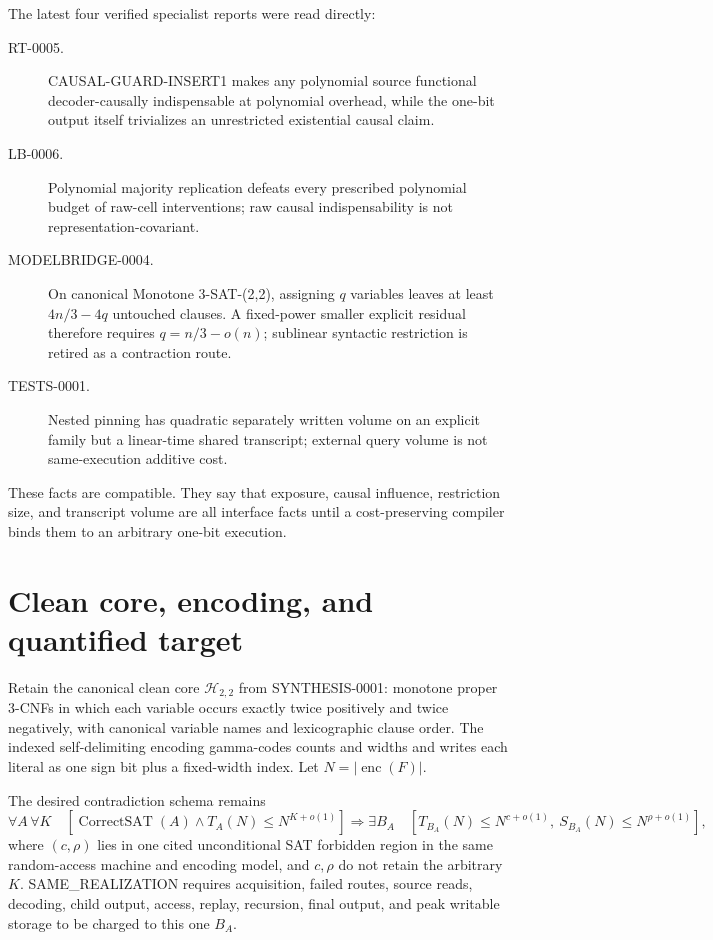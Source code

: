 \documentclass[11pt]{article}
\begin{document}
The latest four verified specialist reports were read directly:
\begin{description}
\item[RT-0005.] \textsf{CAUSAL-GUARD-INSERT1} makes any polynomial source
functional decoder-causally indispensable at polynomial overhead, while the
one-bit output itself trivializes an unrestricted existential causal claim.
\item[LB-0006.] Polynomial majority replication defeats every prescribed
polynomial budget of raw-cell interventions; raw causal indispensability is
not representation-covariant.
\item[MODELBRIDGE-0004.] On canonical Monotone 3-SAT-(2,2), assigning $q$
variables leaves at least $4n/3-4q$ untouched clauses.  A fixed-power smaller
explicit residual therefore requires $q=n/3-o(n)$; sublinear syntactic
restriction is retired as a contraction route.
\item[TESTS-0001.] Nested pinning has quadratic separately written volume on
an explicit family but a linear-time shared transcript; external query volume
is not same-execution additive cost.
\end{description}
These facts are compatible.  They say that exposure, causal influence,
restriction size, and transcript volume are all interface facts until a
cost-preserving compiler binds them to an arbitrary one-bit execution.

\section{Clean core, encoding, and quantified target}
Retain the canonical clean core $\mathcal H_{2,2}$ from SYNTHESIS-0001:
monotone proper 3-CNFs in which each variable occurs exactly twice positively
and twice negatively, with canonical variable names and lexicographic clause
order.  The indexed self-delimiting encoding gamma-codes counts and widths and
writes each literal as one sign bit plus a fixed-width index.  Let
$N=|\operatorname{enc}(F)|$.

The desired contradiction schema remains
\[
\forall A\,\forall K\quad
 [\operatorname{CorrectSAT}(A)\wedge T_A(N)\le N^{K+o(1)}]
 \Longrightarrow \exists B_A\quad
 [T_{B_A}(N)\le N^{c+o(1)},\ S_{B_A}(N)\le N^{\rho+o(1)}],       \tag{1}
\]
where $(c,\rho)$ lies in one cited unconditional SAT forbidden region in the
same random-access machine and encoding model, and $c,\rho$ do not retain the
arbitrary $K$.  SAME\_REALIZATION requires acquisition, failed routes, source
reads, decoding, child output, access, replay, recursion, final output, and
peak writable storage to be charged to this one $B_A$.
\end{document}
